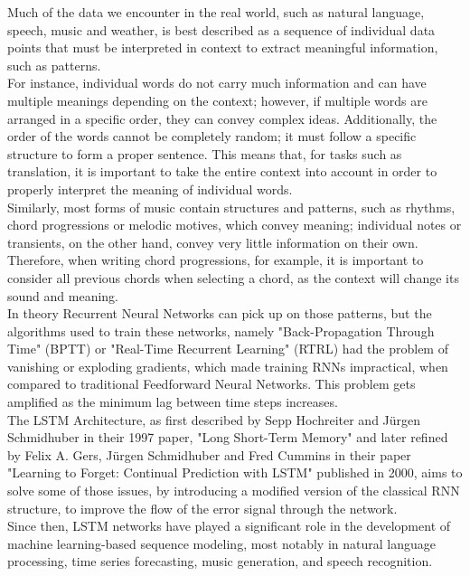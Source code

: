 \documentclass[twoside,a4paper,10pt,DIV=12,BCOR=12mm]{scrartcl}
\begin{document}
Much of the data we encounter in the real world, such as natural language, speech, music and weather, is best described as a sequence of individual data points that must be interpreted in context to extract meaningful information, such as patterns.\\
For instance, individual words do not carry much information and can have multiple meanings depending on the context; however, if multiple words are arranged in a specific order, they can convey complex ideas. Additionally, the order of the words cannot be completely random; it must follow a specific structure to form a proper sentence. This means that, for tasks such as translation, it is important to take the entire context into account in order to properly interpret the meaning of individual words.\cite{harris1954languagestructure}\\
Similarly, most forms of music contain structures and patterns, such as rhythms, chord progressions or melodic motives, which convey meaning; individual notes or transients, on the other hand, convey very little information on their own. Therefore, when writing chord progressions, for example, it is important to consider all previous chords when selecting a chord, as the context will change its sound and meaning.\cite{eck2002musicgeneration}\\
In theory Recurrent Neural Networks can pick up on those patterns, but the algorithms used to train these networks, namely "Back-Propagation Through Time" (BPTT) or "Real-Time Recurrent Learning" (RTRL) had the problem of vanishing or exploding gradients, which made training RNNs impractical, when compared to traditional Feedforward Neural Networks. This problem gets amplified as the minimum lag between time steps increases.\cite{hochreiter1997lstm,werb1990bptt}\\
The LSTM Architecture, as first described by Sepp Hochreiter and Jürgen Schmidhuber in their 1997 paper, "Long Short-Term Memory" and later refined by Felix A. Gers, Jürgen Schmidhuber and Fred Cummins in their paper "Learning to Forget: Continual Prediction with LSTM" published in 2000, aims to solve some of those issues, by introducing a modified version of the classical RNN structure, to improve the flow of the error signal through the network.\cite{hochreiter1997lstm}\\
Since then, LSTM networks have played a significant role in the development of machine learning-based sequence modeling, most notably in natural language processing, time series forecasting, music generation, and speech recognition.\cite{eck2002musicgeneration,torres2022elctricityforecasting,gers2001timeseries,nielsen2024electricitypriceforcasting, gers2000lstmnlp}\\
\end{document}
